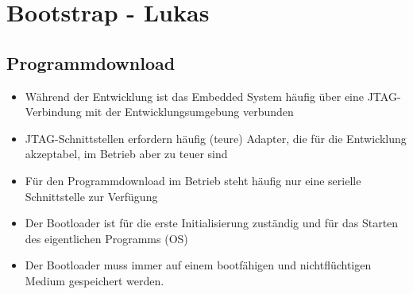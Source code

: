 \section{Bootstrap - Lukas}
\subsection{Programmdownload }
\begin{itemize}
	\item Während der Entwicklung ist das Embedded System häufig über eine JTAG-Verbindung mit der 
	      Entwicklungsumgebung verbunden 
	\item JTAG-Schnittstellen erfordern häufig (teure) Adapter, die für die Entwicklung akzeptabel, 
	      im Betrieb aber zu teuer sind
	\item Für den Programmdownload im Betrieb steht häufig nur eine serielle Schnittstelle zur Verfügung
	\item Der Bootloader ist für die erste Initialisierung zuständig und für das Starten des eigentlichen
	      Programms (OS)
  \item Der Bootloader muss immer auf einem bootfähigen und nichtflüchtigen Medium gespeichert werden.
\end{itemize}
